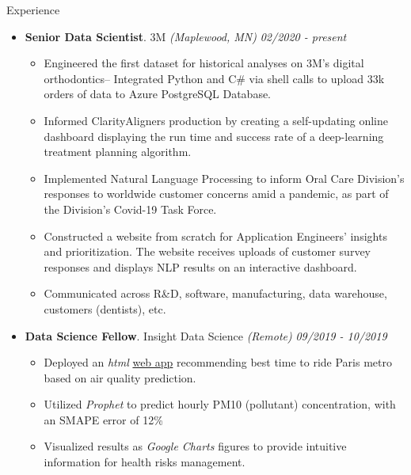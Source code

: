 \documentclass{resume} %
\begin{document}
	
	\begin{rSection}{Experience}
		
		\begin{itemize}[leftmargin=0em]
			
			\item {\bf Senior Data Scientist}{. 3M \textit{(Maplewood, MN)}} \hfill {\em 02/2020 - present}\\
			\vspace{-5mm}
			\begin{itemize}
				\setlength\itemsep{-1.75em}			
				\item Engineered the first dataset for historical analyses on 3M's digital orthodontics-- Integrated Python and C\# via shell calls to upload 33k orders of data to Azure PostgreSQL Database.\\
				\item Informed Clarity\texttrademark Aligners production by creating a self-updating online dashboard displaying the run time and success rate of a deep-learning treatment planning algorithm.\\
				\item Implemented Natural Language Processing to inform Oral Care Division's responses to worldwide customer concerns amid a pandemic, as part of the Division's Covid-19 Task Force.\\
				\item Constructed a website from scratch for Application Engineers' insights and prioritization. The website receives uploads of customer survey responses and displays NLP results on an interactive dashboard.\\
				\item Communicated across R\&D, software, manufacturing, data warehouse, customers (dentists), etc.\\
			\end{itemize}	
		
			\item {\bf Data Science Fellow}{. Insight Data Science \textit{(Remote)}} \hfill {\em 09/2019 - 10/2019}\\
			\vspace{-5mm}
			\begin{itemize}
				\setlength\itemsep{-1.75em}
				\item Deployed an \textit{html} \href{https://tinyurl.com/parispollute}{web app} recommending best time to ride Paris metro based on air quality prediction.\\
				\item Utilized \textit{Prophet} to predict hourly PM10 (pollutant) concentration, with an SMAPE error of 12\% \\
				\item Visualized results as \textit{Google Charts} figures to provide intuitive information for health risks management.
			\end{itemize}	
			

\end{itemize}
\end{rSection}
\end{document}
